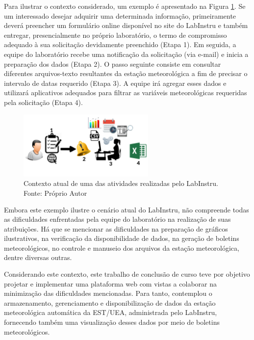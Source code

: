 Para ilustrar o contexto considerado, um exemplo é apresentado na Figura \ref{fig:contexto}. Se um interessado desejar adquirir uma determinada informação, primeiramente deverá preencher um formulário online disponível no site do LabInstru e também entregar, presencialmente no próprio laboratório, o termo de compromisso adequado à sua solicitação devidamente preenchido (Etapa 1). Em seguida, a equipe do laboratório recebe uma notificação da solicitação (via e-mail) e inicia a preparação dos dados (Etapa 2). O passo seguinte consiste em consultar diferentes arquivos-texto resultantes da estação meteorológica a fim de precisar o intervalo de datas requerido (Etapa 3). A equipe irá agregar esses dados e utilizará aplicativos adequados para filtrar as variáveis meteorológicas requeridas pela solicitação (Etapa 4).

\begin{figure}[H]
	\centering
	\includegraphics[width=0.6\textwidth]{./img/contexto.png}
	\caption{Contexto atual de uma das atividades realizadas pelo LabInstru. Fonte: Próprio Autor} 			\label{fig:contexto}
\end{figure}

Embora este exemplo ilustre o cenário atual do LabInstru, não compreende todas as dificuldades enfrentadas pela equipe do laboratório na realização de suas atribuições. Há que se mencionar as dificuldades na preparação de gráficos ilustrativos, na verificação da disponibilidade de dados, na geração de boletins meteorológicos, no controle e manuseio dos arquivos da estação meteorológica, dentre diversas outras.

Considerando este contexto, este trabalho de conclusão de curso teve por objetivo projetar e implementar uma plataforma web com vistas a colaborar na minimização das dificuldades mencionadas. Para tanto, contemplou o armazenamento, gerenciamento e disponibilização de dados da estação meteorológica automática da EST/UEA, administrada pelo LabInstru, fornecendo também uma visualização desses dados por meio de boletins meteorológicos.


